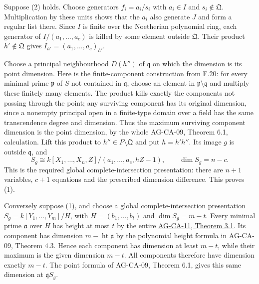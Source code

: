 \documentclass[11pt,a4paper,openany]{report}
\newcounter{none}
\begin{document}
Suppose (2) holds. Choose generators \(f_i=a_i/s_i\) with \(a_i\in I\) and \(s_i\notin\mathfrak Q\). Multiplication by these units shows that the \(a_i\) also generate \(J\) and form a regular list there. Since \(I\) is finite over the Noetherian polynomial ring, each generator of \(I/(a_1,\ldots,a_c)\) is killed by some element outside \(\mathfrak Q\). Their product \(h'\notin\mathfrak Q\) gives \(I_{h'}=(a_1,\ldots,a_c)_{h'}\).

Choose a principal neighbourhood \(D(h'')\) of \(\mathfrak q\) on which the dimension is its point dimension. Here is the finite-component construction from F.20: for every minimal prime \(\mathfrak p\) of \(S\) not contained in \(\mathfrak q\), choose an element in \(\mathfrak p\setminus\mathfrak q\) and multiply these finitely many elements. The product kills exactly the components not passing through the point; any surviving component has its original dimension, since a nonempty principal open in a finite-type domain over a field has the same transcendence degree and dimension. Thus the maximum surviving component dimension is the point dimension, by the whole AG-CA-09, Theorem 6.1, calculation. Lift this product to \(h''\in P\setminus\mathfrak Q\) and put \(h=h'h''\). Its image \(g\) is outside \(\mathfrak q\), and \[S_g\cong k[X_1,\ldots,X_n,Z]/
(a_1,\ldots,a_c,hZ-1),\qquad \dim S_g=n-c.\] This is the required global complete-intersection presentation: there are \(n+1\) variables, \(c+1\) equations and the prescribed dimension difference. This proves (1).

Conversely suppose (1), and choose a global complete-intersection presentation \(S_g=k[Y_1,\ldots,Y_m]/H\), with \(H=(b_1,\ldots,b_t)\) and \(\dim S_g=m-t\). Every minimal prime \(\mathfrak a\) over \(H\) has height at most \(t\) by the entire \href{https://github.com/KokunoYumeto/open-math-courses/blob/d02d0a3669f42579db037cd44de1d113fdd770a1/docs/courses/AG-CA/src/dimension-theory-of-noetherian-local-rings.md}{AG-CA-11, Theorem 3.1}. Its component has dimension \(m-\operatorname{ht}\mathfrak a\) by the polynomial height formula in AG-CA-09, Theorem 4.3. Hence each component has dimension at least \(m-t\), while their maximum is the given dimension \(m-t\). All components therefore have dimension exactly \(m-t\). The point formula of AG-CA-09, Theorem 6.1, gives this same dimension at \(\mathfrak qS_g\).
\end{document}
